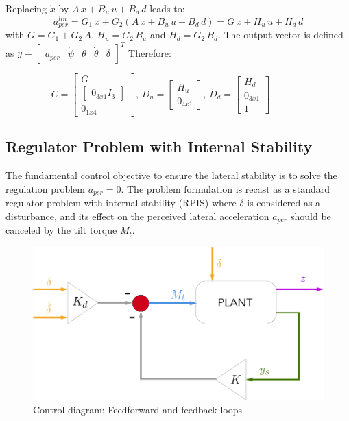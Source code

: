 Replacing $\dot{x}$ by $A\,x+B_{u}\,u+B_{d}\,d$ leads to:
\[a_{per}^{lin}=G_{1}\,x+G_{2}(A\,x+B_{u}\,u+B_{d}\,d)=G\,x+H_{u}\,u+H_{d}\,d\]
with $G=G_{1}+G_{2}\,A$, $H_{u}=G_{2}\,B_{u}$ and $H_{d}=G_{2}\,B_{d}$. The output vector is defined as $y=\begin{bmatrix} a_{per} & \dot{\psi} & \theta & \dot{\theta} & \delta \end{bmatrix}^{T}$ Therefore:

$\hspace{2cm} C=\begin{bmatrix}
G \\ \begin{bmatrix} 0_{3x1} I_{3} \end{bmatrix} \\ 0_{1x4} 
\end{bmatrix}$, $D_{u}=\begin{bmatrix}
H_{u} \\ 0_{4x1}
\end{bmatrix}$, $D_{d}=\begin{bmatrix}
H_{d} \\ 0_{3x1} \\ 1
\end{bmatrix}$

\subsection{Regulator Problem with Internal Stability \cite{6315042}}

The fundamental control objective to ensure the lateral stability is to solve the regulation problem $a_{per}=0$. The problem formulation is recast as a standard regulator problem with internal stability (RPIS) where $\delta$ is considered as a disturbance, and its effect on the perceived lateral acceleration $a_{per}$ should be canceled by the tilt torque $M_{t}$. 

\begin{figure}[!h]
	\includegraphics[width=0.95\linewidth]{figs/03/control}
	\caption{Control diagram: Feedforward and feedback loops}
	\label{control}
\end{figure}

